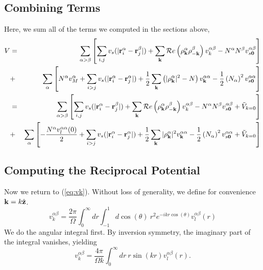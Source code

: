 \subsection{Combining Terms}
Here, we sum all of the terms we computed in the sections above,
\begin{eqnarray}
V & = & \sum_{\alpha > \beta} \left[\sum_{i,j} v_s(|\vr_i^\alpha
  -\vr_j^\beta|) + \sum_\vk \mathcal{R}e\left(\rho_\vk^\alpha
  \rho_{-\vk}^\beta\right)v^{\alpha\beta}_k  -N^\alpha N^\beta
  v^{\alpha \beta}_{s\mathbf{0}}  \right] \nonumber \\
& + & \sum_\alpha \left[ N^\alpha v_M^\alpha + \sum_{i>j} v_s(|\vr_i^\alpha -
  \vr_j^\alpha|) + \frac{1}{2} \sum_\vk \left( |\rho_\vk^\alpha|^2 -
  N\right) v^{\alpha\alpha}_\vk -\frac{1}{2}\left(N_\alpha\right)^2 v_{s\mathbf{0}}^{\alpha\alpha}\right] \nonumber \\
& = & \sum_{\alpha > \beta} \left[\sum_{i,j} v_s(|\vr_i^\alpha
  -\vr_j^\beta|) + \sum_\vk \mathcal{R}e\left(\rho_\vk^\alpha
  \rho_{-\vk}^\beta\right) v^{\alpha \beta}_k   -N^\alpha N^\beta
  v^{\alpha \beta}_{s\mathbf{0}}  +\tilde{V}_{k=0} \right] \\
& + & \sum_\alpha \left[ -\frac{N^\alpha v_l^{\alpha \alpha}(0)}{2}  + \sum_{i>j} v_s(|\vr_i^\alpha -
  \vr_j^\alpha|) + \frac{1}{2} \sum_\vk |\rho_\vk^\alpha|^2 v^{\alpha\alpha}_\vk - \frac{1}{2}\left(N_\alpha\right)^2
  v_{s\mathbf{0}}^{\alpha\alpha} +\tilde{V}_{k=0}\right]  \nonumber
\end{eqnarray}

\subsection {Computing the Reciprocal Potential}
Now we return to (\ref{eq:vk}).  Without loss of generality, we define
for convenience $\vk = k\hat{\mathbf{z}}$.
\begin{equation}
v^{\alpha \beta}_k = \frac{2\pi}{\Omega} \int_0^\infty dr \int_{-1}^1
  d\cos(\theta) \ r^2 e^{-i k r \cos(\theta)} v_l^{\alpha \beta}(r)
\end{equation}
We do the angular integral first.  By inversion symmetry, the
imaginary part of the integral vanishes, yielding
\begin{equation}
v^{\alpha \beta}_k = \frac{4\pi}{\Omega k}\int _0^\infty dr\ r \sin(kr)
v^{\alpha \beta}_l(r).
\label{eq:vkint}
\end{equation}


